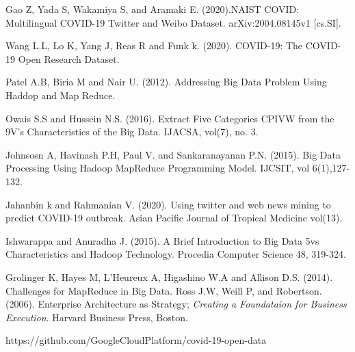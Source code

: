 \documentclass[12pt,letterpaper, twoside]{article}
\begin{document}
\begin{thebibliography}{11}
Gao Z, Yada S,  Wakamiya S, and Aramaki E. (2020).NAIST COVID: Multilingual COVID-19 Twitter and Weibo Dataset. arXiv:2004.08145v1 [cs.SI].

Wang L.L, Lo K, Yang J, Reas R and Funk k. (2020). COVID-19: The COVID-19 Open Research Dataset.

Patel A.B, Biria M and Nair U. (2012). Addressing Big Data Problem Using Haddop and Map Reduce.

Owais S.S and Hussein N.S. (2016). Extract Five Categories CPIVW from the 9V's Characteristics of the Big Data. IJACSA, vol(7), no. 3.

Johnsosn A, Havinash P.H, Paul V. and Sankaranayanan P.N. (2015). Big Data Processing Using Hadoop MapReduce Programming Model. IJCSIT, vol 6(1),127-132.

Jahanbin k and Rahmanian V. (2020). Using twitter and web news mining to predict COVID-19 outbreak. Asian Pacific Journal of Tropical Medicine vol(13). 

Ishwarappa and Anuradha J. (2015). A Brief Introduction to Big Data 5vs Characteristics and Hadoop Technology. Procedia Computer Science 48, 319-324.

Grolinger K, Hayes M, L'Heureux A, Higashino W.A and Allison D.S. (2014). Challenges for MapReduce in Big Data.
Ross J.W, Weill P, and Robertson. (2006). Enterprise Architecture as Strategy; \textit{Creating a Foundataion for Business Execution}. Harvard Business Press, Boston.

https://github.com/GoogleCloudPlatform/covid-19-open-data

\end{thebibliography}
\end{document}

